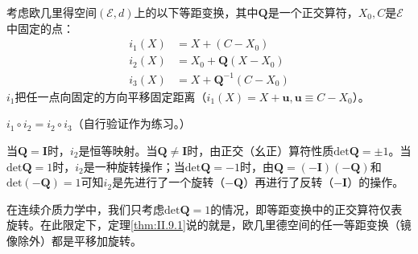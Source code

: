 \documentclass[main.tex]{subfiles}
\begin{document}
\begin{example}
考虑欧几里得空间$\left(\mathcal{E},d\right)$上的以下等距变换，其中$\mathbf{Q}$是一个正交算符，$X_0,C$是$\mathcal{E}$中固定的点：
\begin{align*}
    i_1\left(X\right)&=X+\left(C-X_0\right)\\
    i_2\left(X\right)&=X_0+\mathbf{Q}\left(X-X_0\right)\\
    i_3\left(X\right)&=X+\mathbf{Q}^{-1}\left(C-X_0\right)
\end{align*}
$i_1$把任一点向固定的方向平移固定距离（$i_1\left(X\right)=X+\mathbf{u},\mathbf{u}\equiv C-X_0$）。

$i_1\circ i_2=i_2\circ i_3$（自行验证作为练习。）

当$\mathbf{Q}=\mathbf{I}$时，$i_2$是恒等映射。当$\mathbf{Q}\neq\mathbf{I}$时，由正交（幺正）算符性质$\mathrm{det}\mathbf{Q}=\pm 1$。当$\mathrm{det}\mathbf{Q}=1$时，$i_2$是一种旋转操作；当$\mathrm{det}\mathbf{Q}=-1$时，由$\mathbf{Q}=\left(-\mathbf{I}\right)\left(-\mathbf{Q}\right)$和$\mathrm{det}\left(-\mathbf{Q}\right)=1$可知$i_2$是先进行了一个旋转（$-\mathbf{Q}$）再进行了反转（$-\mathbf{I}$）的操作。
\end{example}

在连续介质力学中，我们只考虑$\mathrm{det}\mathbf{Q}=1$的情况，即等距变换中的正交算符仅表旋转。在此限定下，定理\ref{thm:II.9.1}说的就是，欧几里德空间的任一等距变换（镜像除外）都是平移加旋转。
\end{document}
